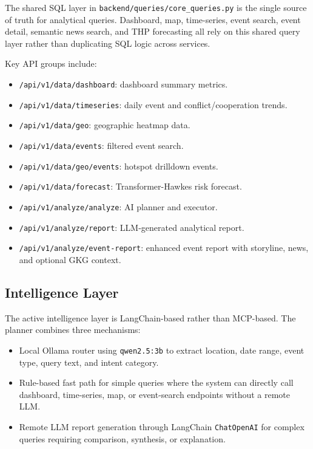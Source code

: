 \documentclass[11pt]{article}
\begin{document}
The shared SQL layer in \texttt{backend/queries/core\_queries.py} is the single source of truth for analytical queries. Dashboard, map, time-series, event search, event detail, semantic news search, and THP forecasting all rely on this shared query layer rather than duplicating SQL logic across services.

Key API groups include:

\begin{itemize}
    \item \texttt{/api/v1/data/dashboard}: dashboard summary metrics.
    \item \texttt{/api/v1/data/timeseries}: daily event and conflict/cooperation trends.
    \item \texttt{/api/v1/data/geo}: geographic heatmap data.
    \item \texttt{/api/v1/data/events}: filtered event search.
    \item \texttt{/api/v1/data/geo/events}: hotspot drilldown events.
    \item \texttt{/api/v1/data/forecast}: Transformer-Hawkes risk forecast.
    \item \texttt{/api/v1/analyze/analyze}: AI planner and executor.
    \item \texttt{/api/v1/analyze/report}: LLM-generated analytical report.
    \item \texttt{/api/v1/analyze/event-report}: enhanced event report with storyline, news, and optional GKG context.
\end{itemize}

\subsection{Intelligence Layer}

The active intelligence layer is LangChain-based rather than MCP-based. The planner combines three mechanisms:

\begin{itemize}
    \item Local Ollama router using \texttt{qwen2.5:3b} to extract location, date range, event type, query text, and intent category.
    \item Rule-based fast path for simple queries where the system can directly call dashboard, time-series, map, or event-search endpoints without a remote LLM.
    \item Remote LLM report generation through LangChain \texttt{ChatOpenAI} for complex queries requiring comparison, synthesis, or explanation.
\end{itemize}
\end{document}
